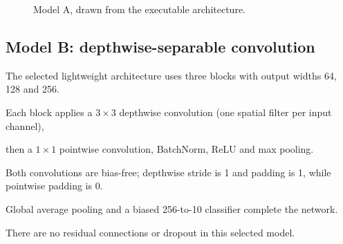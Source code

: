 \documentclass[11pt,a4paper]{article}
\begin{document}
\begin{figure}[htbp]\centering

\caption{Model A, drawn from the executable architecture.}\end{figure}



\subsection{Model B: depthwise-separable convolution}

The selected lightweight architecture uses three blocks with output widths 64, 128 and 256.

Each block applies a $3\times3$ depthwise convolution (one spatial filter per input channel),

then a $1\times1$ pointwise convolution, BatchNorm, ReLU and max pooling.

Both convolutions are bias-free; depthwise stride is 1 and padding is 1, while pointwise padding is 0.

Global average pooling and a biased 256-to-10 classifier complete the network.

There are no residual connections or dropout in this selected model.
\end{document}
